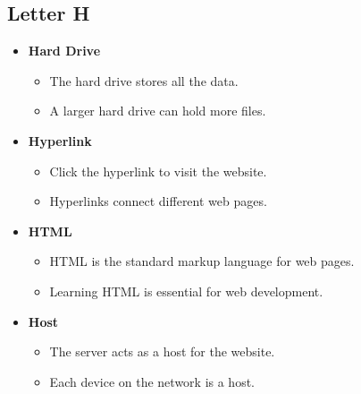     \subsection{Letter H}
    \begin{itemize}
        \item \textbf{Hard Drive}
        \begin{itemize}
            \item The hard drive stores all the data.
            \item A larger hard drive can hold more files.
        \end{itemize}
        \item \textbf{Hyperlink}
        \begin{itemize}
            \item Click the hyperlink to visit the website.
            \item Hyperlinks connect different web pages.
        \end{itemize}
        \item \textbf{HTML}
        \begin{itemize}
            \item HTML is the standard markup language for web pages.
            \item Learning HTML is essential for web development.
        \end{itemize}
        \item \textbf{Host}
        \begin{itemize}
            \item The server acts as a host for the website.
            \item Each device on the network is a host.
        \end{itemize}
    \end{itemize}

